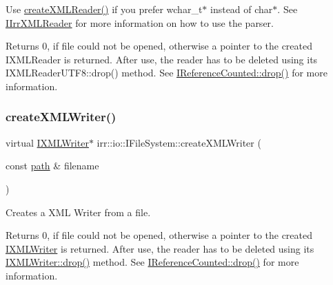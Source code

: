 Use \hyperlink{classirr_1_1io_1_1IFileSystem_a167c9fa159d16ee5c56c074636b0865e}{create\+X\+M\+L\+Reader()} if you prefer wchar\+\_\+t$\ast$ instead of char$\ast$. See \hyperlink{classirr_1_1io_1_1IIrrXMLReader}{I\+Irr\+X\+M\+L\+Reader} for more information on how to use the parser. \begin{DoxyReturn}{Returns}
0, if file could not be opened, otherwise a pointer to the created I\+X\+M\+L\+Reader is returned. After use, the reader has to be deleted using its I\+X\+M\+L\+Reader\+U\+T\+F8\+::drop() method. See \hyperlink{classirr_1_1IReferenceCounted_a03856a09355b89d178090c4a5f738543}{I\+Reference\+Counted\+::drop()} for more information. 
\end{DoxyReturn}
\mbox{\label{classirr_1_1io_1_1IFileSystem_a0737712d1c90001e5765ef46912c616d}} 
\subsubsection{\texorpdfstring{create\+X\+M\+L\+Writer()}{createXMLWriter()}\hspace{0.1cm}{\footnotesize\ttfamily [1/4]}}
{\footnotesize\ttfamily virtual \hyperlink{classirr_1_1io_1_1IXMLWriter}{I\+X\+M\+L\+Writer}$\ast$ irr\+::io\+::\+I\+File\+System\+::create\+X\+M\+L\+Writer (\begin{DoxyParamCaption}\item[{const \hyperlink{namespaceirr_1_1io_a6468281622ce3a1c46b72e19f32dded5}{path} \&}]{filename }\end{DoxyParamCaption})\hspace{0.3cm}{\ttfamily [pure virtual]}}



Creates a X\+ML Writer from a file. 

\begin{DoxyReturn}{Returns}
0, if file could not be opened, otherwise a pointer to the created \hyperlink{classirr_1_1io_1_1IXMLWriter}{I\+X\+M\+L\+Writer} is returned. After use, the reader has to be deleted using its \hyperlink{classirr_1_1IReferenceCounted_a03856a09355b89d178090c4a5f738543}{I\+X\+M\+L\+Writer\+::drop()} method. See \hyperlink{classirr_1_1IReferenceCounted_a03856a09355b89d178090c4a5f738543}{I\+Reference\+Counted\+::drop()} for more information. 
\end{DoxyReturn}
\mbox{\label{classirr_1_1io_1_1IFileSystem_a0737712d1c90001e5765ef46912c616d}} 
